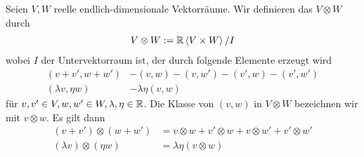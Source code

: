 Seien $V,W$ reelle endlich-dimensionale Vektorräume. Wir definieren das  $V\otimes W$ durch
\begin{align*}
V \otimes W := \mathbb{R}\left<V\times W\right>/I
\end{align*}
wobei $I$ der Untervektorraum ist, der durch folgende Elemente erzeugt wird
\begin{align*}
(v+v', w + w') &- (v, w) - (v, w') - (v', w) - (v', w')\\
(\lambda v, \eta w) &- \lambda \eta (v, w)
\end{align*}
für $v,v'\in V, w, w'\in W, \lambda, \eta \in \mathbb{R}$. Die Klasse von $(v,w)$ in $V\otimes W$ bezeichnen wir mit $v\otimes w$. Es gilt dann
\begin{align*}
(v+v') \otimes (w + w') &= v \otimes w + v' \otimes w + v\otimes w' + v'\otimes w'\\
(\lambda v) \otimes (\eta w) &= \lambda \eta (v\otimes w)
\end{align*}
